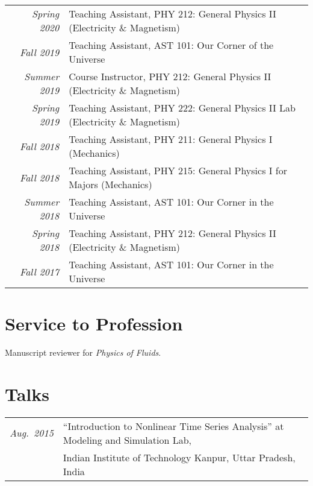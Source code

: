 \documentclass[10pt]{article}
\begin{document}
\begin{longtable}{@{}rl}
  \emph{Spring 2020} & Teaching Assistant, PHY 212: General Physics II (Electricity \& Magnetism)\\
  \emph{Fall 2019}   & Teaching Assistant, AST 101: Our Corner of the Universe\\
  \emph{Summer 2019} & Course Instructor, PHY 212: General Physics II (Electricity \& Magnetism)\\
  \emph{Spring 2019} & Teaching Assistant, PHY 222: General Physics II Lab (Electricity \& Magnetism)\\
  \emph{Fall 2018}   & Teaching Assistant, PHY 211: General Physics I (Mechanics)\\
  \emph{Fall 2018}   & Teaching Assistant, PHY 215: General Physics I for Majors (Mechanics)\\
  \emph{Summer 2018} & Teaching Assistant, AST 101: Our Corner in the Universe\\
  \emph{Spring 2018} & Teaching Assistant, PHY 212: General Physics II (Electricity \& Magnetism)\\
  \emph{Fall 2017}   & Teaching Assistant, AST 101: Our Corner in the Universe
\end{longtable}


\section*{Service to Profession}

Manuscript reviewer for \emph{Physics of Fluids}.


\section*{Talks}

\begin{tabular}{@{}ll}
  \emph{Aug.~2015} & ``Introduction to Nonlinear Time Series Analysis'' at Modeling and Simulation Lab,\\ & Indian Institute of Technology Kanpur, Uttar Pradesh, India
\end{tabular}


\end{document}
